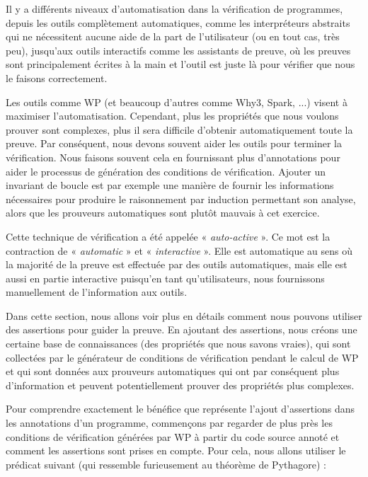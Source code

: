 Il y a différents niveaux d'automatisation dans la vérification de programmes,
depuis les outils complètement automatiques, comme les interpréteurs abstraits
qui ne nécessitent aucune aide de la part de l'utilisateur (ou en tout cas, très peu),
jusqu'aux outils interactifs comme les assistants de preuve, où les preuves sont
principalement écrites à la main et l'outil est juste là pour vérifier que nous
le faisons correctement.


Les outils comme WP (et beaucoup d'autres comme Why3, Spark, ...) visent à
maximiser l'automatisation. Cependant, plus les propriétés que nous voulons
prouver sont complexes, plus il sera difficile d'obtenir automatiquement toute
la preuve. Par conséquent, nous devons souvent aider les outils pour terminer
la vérification. Nous faisons souvent cela en fournissant plus d'annotations
pour aider le processus de génération des conditions de vérification. Ajouter un
invariant de boucle est par exemple une manière de fournir les informations
nécessaires pour produire le raisonnement par induction permettant son analyse,
alors que les prouveurs automatiques sont plutôt mauvais à cet exercice.


Cette technique de vérification a été appelée « \textit{auto-active} ». Ce mot est la
contraction de « \textit{automatic} » et « \textit{interactive} ». Elle est automatique au sens
où la majorité de la preuve est effectuée par des outils automatiques, mais
elle est aussi en partie interactive puisqu'en tant qu'utilisateurs, nous
fournissons manuellement de l'information aux outils.


Dans cette section, nous allons voir plus en détails comment nous pouvons
utiliser des assertions pour guider la preuve. En ajoutant des assertions, nous
créons une certaine base de connaissances (des propriétés que nous savons vraies),
qui sont collectées par le générateur de conditions de vérification pendant le calcul
de WP et qui sont données aux prouveurs automatiques qui ont par conséquent plus
d'information et peuvent potentiellement prouver des propriétés plus complexes.




Pour comprendre exactement le bénéfice que représente l'ajout d'assertions dans
les annotations d'un programme, commençons par regarder de plus près les
conditions de vérification générées par WP à partir du code source annoté et comment
les assertions sont prises en compte. Pour cela, nous allons utiliser le prédicat
suivant (qui ressemble furieusement au théorème de Pythagore) :



